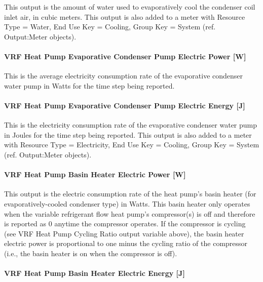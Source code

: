 This output is the amount of water used to evaporatively cool the condenser coil inlet air, in cubic meters. This output is also added to a meter with Resource Type = Water, End Use Key = Cooling, Group Key = System (ref. Output:Meter objects).

\paragraph{VRF Heat Pump Evaporative Condenser Pump Electric Power {[}W{]}}\label{vrf-heat-pump-evaporative-condenser-pump-electric-power-w}

This is the average electricity consumption rate of the evaporative condenser water pump in Watts for the time step being reported.

\paragraph{VRF Heat Pump Evaporative Condenser Pump Electric Energy {[}J{]}}\label{vrf-heat-pump-evaporative-condenser-pump-electric-energy-j}

This is the electricity consumption rate of the evaporative condenser water pump in Joules for the time step being reported. This output is also added to a meter with Resource Type = Electricity, End Use Key = Cooling, Group Key = System (ref. Output:Meter objects).

\paragraph{VRF Heat Pump Basin Heater Electric Power {[}W{]}}\label{vrf-heat-pump-basin-heater-electric-power-w}

This output is the electric consumption rate of the heat pump's basin heater (for evaporatively-cooled condenser type) in Watts. This basin heater only operates when the variable refrigerant flow heat pump's compressor(s) is off and therefore is reported as 0 anytime the compressor operates. If the compressor is cycling (see VRF Heat Pump Cycling Ratio output variable above), the basin heater electric power is proportional to one minus the cycling ratio of the compressor (i.e., the basin heater is on when the compressor is off).

\paragraph{VRF Heat Pump Basin Heater Electric Energy {[}J{]}}\label{vrf-heat-pump-basin-heater-electric-energy-j}

